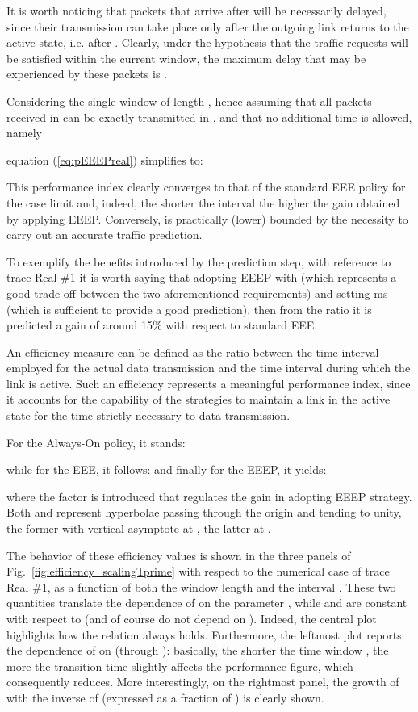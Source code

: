 \documentclass[journal,10pt,twoside,final]{IEEEtran}
\begin{document}
It is worth noticing that packets that arrive after  will be necessarily delayed, since their transmission can take place only after the outgoing link returns to the active state, i.e. after . Clearly, under the hypothesis that the traffic requests will be satisfied within the current window, the maximum delay that may be experienced by these packets is .



Considering the single window of length , hence assuming that all packets received in  can be exactly transmitted in , and that no additional time  is allowed, namely

equation (\ref{eq:pEEEPreal}) simplifies to:

This performance index clearly converges to that of the standard EEE policy for the case limit  and, indeed, the shorter the interval  the higher the gain obtained by applying EEEP. Conversely,  is practically (lower) bounded by the necessity to carry out an accurate traffic prediction.

To exemplify the benefits introduced by the prediction step, with reference to trace Real \#1 it is worth saying that adopting EEEP with  (which represents a good trade off between the two aforementioned requirements) and setting  ms (which is sufficient to provide a good prediction), then from the ratio  it is predicted a gain of around 15\% with respect to standard EEE.
 
An efficiency measure can be defined as the ratio between the time interval employed for the actual data transmission and the time interval during which the link is active. Such an efficiency represents a meaningful performance index, since it accounts for the capability of the strategies to maintain a link in the active state for the time strictly necessary to data transmission.

For the Always-On policy, it stands:

while for the EEE, it follows: 
and finally for the EEEP, it yields:


where the factor  is introduced that regulates the gain in adopting EEEP strategy. 
Both  and  represent hyperbolae passing through the origin and tending to unity, the former with vertical asymptote at , the latter at . 



The behavior of these efficiency values is shown in the three panels of Fig.~\ref{fig:efficiency_scalingTprime} with respect to the numerical case of trace Real \#1, as a function of both the window length  and the interval . 
These two quantities translate the dependence of  on the parameter , while  and  are constant with respect to  (and of course do not depend on ). Indeed, the central plot highlights how the relation  always holds.
Furthermore, the leftmost plot reports the dependence of   on  (through ): basically, the shorter the time window , the more the transition time  slightly affects the performance figure, which consequently reduces.
More interestingly, on the rightmost panel, the growth of  with the inverse of  (expressed as a fraction of ) is clearly shown. 
\end{document}
